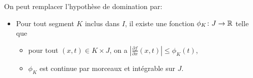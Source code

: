 \documentclass{book}
\begin{document}
\begin{Theoreme}
On peut remplacer l'hypothèse de domination par:
\begin{itemize}
\item
  Pour tout segment $K$ inclus dans $I$,
  il existe une fonction $\phi_K \colon J \to \mathbb{R}$ telle que

  \begin{itemize}
  \item
    pour tout $(x,t)\in K\times J$, on a $\left|\frac{\partial f}{\partial x} (x,t)\right|\leq\phi _K(t)$,
  \item
    $\phi _K$ est continue par morceaux et intégrable sur $J$.
  \end{itemize}
\end{itemize}
\end{Theoreme}
\end{document}
